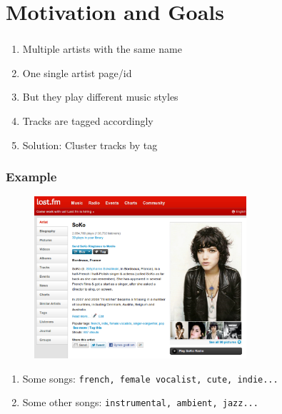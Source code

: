 \documentclass[slidestop,compress,mathserif,serif,notes=show]{beamer}
\title{\docTitle}
\begin{document}
  


  \section{Motivation and Goals}
  \begin{frame}
    \frametitle{\secname}
    \vspace*{0.5cm}
    \begin{enumerate}
      \item{}
      Multiple artists with the same name
      \item{}
      One single artist page/id
      \item{}
      But they play different music styles
      \item{}
      Tracks are tagged accordingly
      \item{}
      Solution: Cluster tracks by tag
    \end{enumerate}
    
  \end{frame}

  \begin{frame}
    \frametitle{Example}
    \vspace*{0.5cm}
    \begin{figure}
      \centering 
      \includegraphics[width=0.7\textwidth]{figs/soko.pdf} 
      \label{fig:soko} 
    \end{figure}
    \begin{enumerate}
      \item{}
      Some songs: \texttt{french, female vocalist, cute, indie...}
      \item{}
      Some other songs: \texttt{instrumental, ambient, jazz...}
    \end{enumerate}
  \end{frame}
\end{document}
